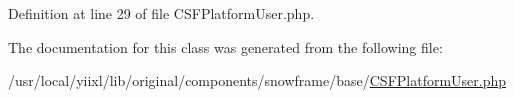 Definition at line 29 of file CSFPlatformUser.php.



The documentation for this class was generated from the following file:\begin{DoxyCompactItemize}
\item 
/usr/local/yiixl/lib/original/components/snowframe/base/\hyperlink{CSFPlatformUser_8php}{CSFPlatformUser.php}\end{DoxyCompactItemize}
